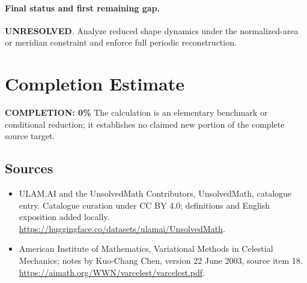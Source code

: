 \documentclass[11pt]{article}
\begin{document}
\paragraph{Final status and first remaining gap.}
\textbf{UNRESOLVED}. Analyze reduced shape dynamics under the normalized-area or meridian constraint and enforce full periodic reconstruction.

\section{Completion Estimate}
\noindent\textbf{COMPLETION: 0\%}
The calculation is an elementary benchmark or conditional reduction; it establishes no claimed new portion of the complete source target.

\subsection{Sources}
\begin{itemize}
\item[\hypertarget{source:statement:1}{S1}] ULAM.AI and the UnsolvedMath Contributors, UnsolvedMath, catalogue entry. Catalogue curation under CC BY 4.0; definitions and English exposition added locally.
\url{https://huggingface.co/datasets/ulamai/UnsolvedMath}.
\item[\hypertarget{source:statement:2}{S2}] American Institute of Mathematics, Variational Methods in Celestial Mechanics; notes by Kuo-Chang Chen, version 22 June 2003, source item 18.
\url{https://aimath.org/WWN/varcelest/varcelest.pdf}.
\end{itemize}
\label{end:statement}
\end{document}
